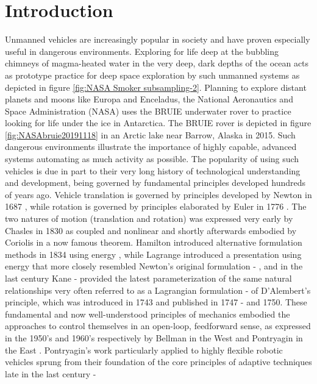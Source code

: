 \documentclass[applsci,article,submit,pdftex,moreauthors]{Definitions/mdpi}
\begin{document}
\section{Introduction}
Unmanned vehicles are increasingly popular in society and have proven especially useful in dangerous environments. Exploring for life deep at the bubbling chimneys of magma-heated water in the very deep, dark depths of the ocean \cite{Gronstal22} acts as prototype practice for deep space exploration by such unmanned systems as depicted in figure \ref{fig:NASA Smoker subsampling-2}. Planning to explore distant planets and moons like Europa and Enceladus, the National Aeronautics and Space Administration (NASA) uses the BRUIE underwater rover to practice looking for life under the ice in Antarctica. The BRUIE rover is depicted in figure \ref{fig:NASAbruie20191118} in an Arctic lake near Barrow, Alaska in 2015.\cite{NASA19} Such dangerous environments illustrate the importance of highly capable, advanced systems automating as much activity as possible. The popularity of using such vehicles is due in part to their very long history of technological understanding and development, being governed by fundamental principles developed hundreds of years ago. Vehicle translation is governed by principles developed by Newton in 1687 \cite{Newton87}, while rotation is governed by principles elaborated by Euler in 1776 \cite{Euler76}. The two natures of motion (translation and rotation) was expressed very early by Chasles in 1830 \cite{Chasles30} as coupled and nonlinear and shortly afterwards embodied by Coriolis in a now famous theorem. \cite{Coriolis35} Hamilton introduced alternative formulation methods in 1834 using energy \cite{Hamilton34}, while Lagrange introduced a presentation using energy that more closely resembled Newton's original formulation \cite{Lagrange11} - \cite{Lagrange15}, and in the last century Kane \cite{Kane59} - \cite{Kane85} provided the latest parameterization of the same natural relationships very often referred to as a Lagrangian formulation \cite{Lagrange11} - \cite{Lagrange15} of D'Alembert's principle, which was introduced in 1743 and published in 1747 \cite{D'Alembert47a} - \cite{D'Alembert47b} and 1750. \cite{D'Alembert50} These fundamental and now well-understood principles of mechanics embodied the approaches to control themselves in an open-loop, feedforward sense, as expressed in the 1950's and 1960's respectively by Bellman in the West \cite{Bellman57} and Pontryagin in the East \cite{Pontryagin62}. Pontryagin's work particularly applied to highly flexible robotic vehicles \cite{Sands19} sprung from their foundation of the core principles of adaptive techniques late in the last century \cite{Slotine90} - \cite{Fossen93} 
\end{document}
